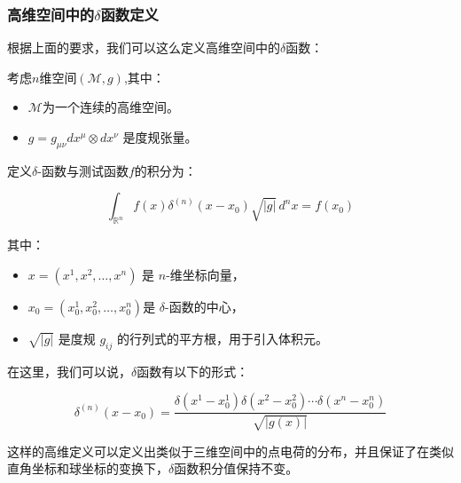 \documentclass[lang=cn,10pt,newtx,bibend=biber,device=pad]{elegantbook}
\begin{document}
\subsubsection{高维空间中的$\delta$函数定义}

根据上面的要求，我们可以这么定义高维空间中的$\delta$函数：

\begin{definition}
考虑$n$维空间$(\mathcal{M}, g)$,其中：

\begin{itemize}
    \item $\mathcal{M}$为一个连续的高维空间。
    \item $g = g_{\mu\nu} dx^\mu \otimes dx^\nu$ 是度规张量。
\end{itemize}

定义$\delta$-函数与测试函数$f$的积分为：

\begin{equation}
\int_{\mathbb{R}^n} f(x) \delta^{(n)}(x - x_0) \sqrt{|g|} \, d^n x = f(x_0)
\end{equation}

其中：

\begin{itemize}
    \item $x = (x^1, x^2, \ldots, x^n)$ 是 $n$-维坐标向量，
    \item $x_0 = (x_0^1, x_0^2, \ldots, x_0^n)$是 $\delta$-函数的中心，
    \item $\sqrt{|g|}$ 是度规 $g_{ij}$ 的行列式的平方根，用于引入体积元。
\end{itemize}

在这里，我们可以说，$\delta$函数有以下的形式：

\begin{equation}
\delta^{(n)}(x - x_0) = \frac{\delta(x^1 - x_0^1) \delta(x^2 - x_0^2) \cdots \delta(x^n - x_0^n)}{\sqrt{|g(x)|}}
\end{equation}
\end{definition}

这样的高维定义可以定义出类似于三维空间中的点电荷的分布，并且保证了在类似直角坐标和球坐标的变换下，$\delta$函数积分值保持不变。
\end{document}
